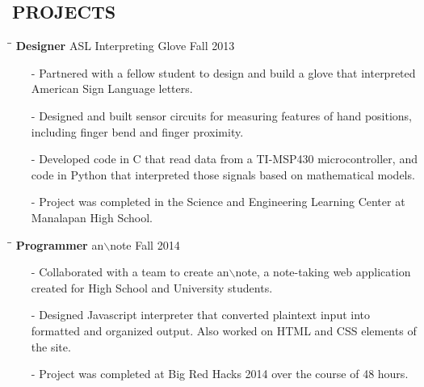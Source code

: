 \documentclass{res}
\begin{document}
\begin{resume}
    
\section{PROJECTS}    
	\vspace{-5pt}
	\begin{tabbing}
    \hspace{2.3in}\= \hspace{2.4in}\= \kill
    {\bf Designer} \>ASL Interpreting Glove \>Fall 2013\\
  \end{tabbing}\vspace{-15pt}
  \begin{itemize}[leftmargin=*, nolistsep]
    \item[-] Partnered with a fellow student to design and build a glove that interpreted American Sign Language letters.
    \item[-] Designed and built sensor circuits for measuring features of hand positions, including finger bend and finger proximity.
    \item[-] Developed code in C that read data from a TI-MSP430 microcontroller, and code in Python that interpreted those signals based on mathematical models.
    \item[-] Project was completed in the Science and Engineering Learning Center at Manalapan High School.
  \end{itemize}
  \vspace{-10pt}
  \begin{tabbing}
    \hspace{2.3in}\= \hspace{2.4in}\= \kill
    {\bf Programmer} \>an$\backslash$note \>Fall 2014\\
  \end{tabbing}\vspace{-15pt}
  \begin{itemize}[leftmargin=*, nolistsep]
    \item[-] Collaborated with a team to create an$\backslash$note, a note-taking web application created for High School and University students.
    \item[-] Designed Javascript interpreter that converted plaintext input into formatted and organized output. Also worked on HTML and CSS elements of the site.
    \item[-] Project was completed at Big Red Hacks 2014 over the course of 48 hours.
  \end{itemize}
  \vspace{-10pt}

\end{resume}
\end{document}
